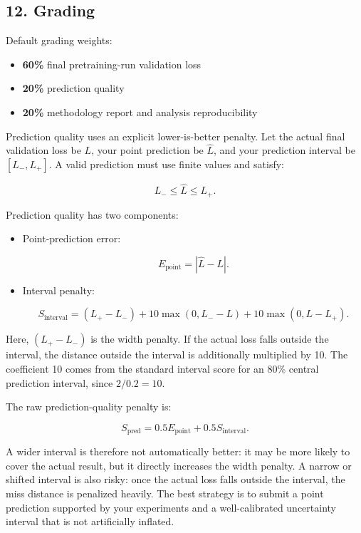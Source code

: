 \documentclass[
  11pt,
]{article}
\providecommand{\tightlist}{%
  \setlength{\itemsep}{0pt}\setlength{\parskip}{0pt}}
\begin{document}
\hypertarget{grading}{%
\subsection{12. Grading}\label{grading}}

Default grading weights:

\begin{itemize}
\tightlist
\item
  \textbf{60\%} final pretraining-run validation loss
\item
  \textbf{20\%} prediction quality
\item
  \textbf{20\%} methodology report and analysis reproducibility
\end{itemize}

Prediction quality uses an explicit lower-is-better penalty. Let the
actual final validation loss be \(L\), your point prediction be
\(\hat{L}\), and your prediction interval be \([L_-, L_+]\). A valid
prediction must use finite values and satisfy:

\[
L_- \le \hat{L} \le L_+.
\]

Prediction quality has two components:

\begin{itemize}
\item
  Point-prediction error:

  \[
  E_{\text{point}} = |\hat{L} - L|.
  \]
\item
  Interval penalty:

  \[
  S_{\text{interval}}
  =
  (L_+ - L_-)
  + 10 \max(0, L_- - L)
  + 10 \max(0, L - L_+).
  \]
\end{itemize}

Here, \((L_+ - L_-)\) is the width penalty. If the actual loss falls
outside the interval, the distance outside the interval is additionally
multiplied by 10. The coefficient 10 comes from the standard interval
score for an 80\% central prediction interval, since \(2 / 0.2 = 10\).

The raw prediction-quality penalty is:

\[
S_{\text{pred}}
=
0.5 E_{\text{point}}
+
0.5 S_{\text{interval}}.
\]

A wider interval is therefore not automatically better: it may be more
likely to cover the actual result, but it directly increases the width
penalty. A narrow or shifted interval is also risky: once the actual
loss falls outside the interval, the miss distance is penalized heavily.
The best strategy is to submit a point prediction supported by your
experiments and a well-calibrated uncertainty interval that is not
artificially inflated.
\end{document}
